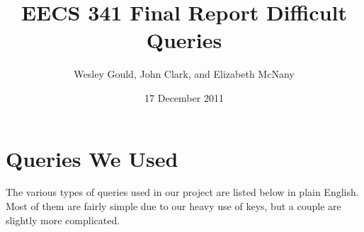 \documentclass{article}
\author{Wesley Gould, John Clark, and Elizabeth McNany}
\date{17 December 2011}
\title{EECS 341 Final Report Difficult Queries}
\begin{document}
\maketitle


\def\ojoin{\setbox0=\hbox{$\bowtie$}%
  \rule[-.02ex]{.25em}{.4pt}\llap{\rule[\ht0]{.25em}{.4pt}}}
\def\leftouterjoin{\mathbin{\ojoin\mkern-5.8mu\bowtie}}


\section{Queries We Used}

The various types of queries used in our project are listed below in plain English.  Most of them are fairly simple due to our heavy use of keys, but a couple are slightly more complicated.
\end{document}
